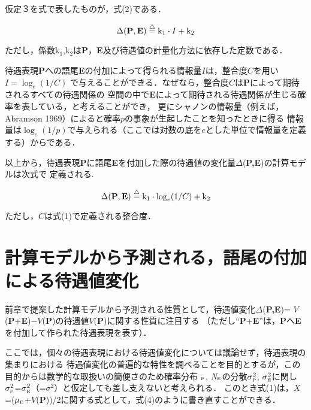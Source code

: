 \medskip

仮定３を式で表したものが，式(2)である．

\begin{equation}
\Delta({\bf P,E}) \stackrel{\triangle}{=} {\rm k}_{1} \cdot I + {\rm k}_{2}  
\end{equation}

ただし，係数k\(_{1}\),k\(_{2}\)は{\bf P}，{\bf E}及び待遇値の計量化方法に依存した定数である．

待遇表現{\bf P}への語尾{\bf E}の付加によって得られる情報量\(I\)は，整合度\(C\)を用い$I=\log_{e}(1/C)$
で与えることができる．なぜなら，整合度\(C\)は{\bf P}によって期待されるすべての待遇関係の
空間の中で{\bf E}によって期待される待遇関係が生じる確率を表している，と考えることができ，
更にシャノンの情報量（例えば，Abramson 1969）によると確率\(p\)の事象が生起したことを知ったときに得る
情報量は$\log_{e}(1/p)$で与えられる（ここでは対数の底を\(e\)とした単位で情報量を定義する）からである．

以上から，待遇表現{\bf P}に語尾{\bf E}を付加した際の待遇値の変化量\(\Delta\)({\bf P,E})の計算モデルは次式で
定義される.

\begin{equation}
\Delta({\bf P,E}) \stackrel{\triangle}{=}   {\rm k}_{1} \cdot \log_{e}(1/C) +{\rm k}_{2}
\end{equation}

ただし，\(C\)は式(1)で定義される整合度．

\section{計算モデルから予測される，語尾の付加による待遇値変化}
前章で提案した計算モデルから予測される性質として，待遇値変化\(\Delta\)({\bf P,E})=
\(V\)({\bf P}+{\bf E})−\(V\)({\bf P})の待遇値\(V\)({\bf P})に関する性質に注目する
（ただし``{\bf P}+{\bf E}''は，{\bf P}へ{\bf E}を付加して作られた待遇表現を表す）．

ここでは，個々の待遇表現における待遇値変化については議論せず，待遇表現の集まりにおける
待遇値変化の普遍的な特性を調べることを目的とするが，この目的からは数学的な取扱いの簡便さのため確率分布
\hspace{-0.2mm}{\em N}\(_{\mbox{\tiny{P}}}\), {\em N}\(_{\mbox{\tiny{E}}}\)\hspace{-0.2mm}の分散\hspace{-0.2mm}\(\sigma_{\mbox{\tiny{P}}}^{2}\), \(\sigma_{\mbox{\tiny{E}}}^{2}\)\hspace{-0.2mm}に関し\hspace{-0.2mm}
\(\sigma_{\mbox{\tiny{P}}}^{2}\)=\(\sigma_{\mbox{\tiny{E}}}^{2}\)（=\(\sigma^{2}\)）\hspace{-0.2mm}と仮定しても差し支えないと考えられる．
このとき式(1)は，\(X\)=(\(\mu_{\mbox{\tiny{E}}}\)+\(V\)({\bf P}))/2に関する式として，式(4)のように書き直すことができる．

